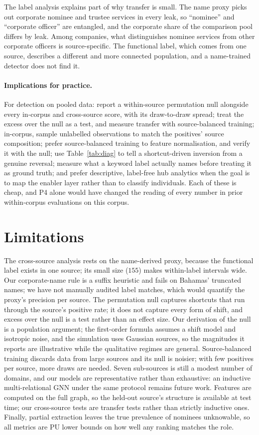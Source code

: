 \documentclass[11pt]{article}
\begin{document}
The label analysis explains part of why transfer is small. The name proxy picks out
corporate nominee and trustee services in every leak, so ``nominee'' and
``corporate officer'' are entangled, and the corporate share of the comparison
pool differs by leak. Among companies, what distinguishes nominee services from
other corporate officers is source-specific. The functional label, which comes
from one source, describes a different and more connected population, and a
name-trained detector does not find it.

\paragraph{Implications for practice.} For detection on pooled data: report a within-source permutation null alongside
every in-corpus and cross-source score, with its draw-to-draw spread; treat the
excess over the null as a test, and measure transfer with source-balanced training;
in-corpus, sample unlabelled observations to match the positives' source
composition; prefer source-balanced training to feature normalisation, and verify
it with the null; use Table~\ref{tab:diag} to tell a shortcut-driven inversion from a
genuine reversal; measure what a keyword label actually
names before treating it as ground truth; and prefer descriptive, label-free hub
analytics when the goal is to map the enabler layer rather than to classify
individuals. Each of these is cheap, and P4 alone would have changed the reading
of every number in prior within-corpus evaluations on this corpus.

\section{Limitations}
The cross-source analysis rests on the name-derived proxy, because the functional
label exists in one source; its small size ($155$) makes within-label intervals
wide. Our corporate-name rule is a suffix heuristic and fails on Bahamas' truncated
names; we have not manually audited label matches, which would quantify the
proxy's precision per source. The permutation null captures shortcuts that run
through the source's positive rate; it does not capture every form of shift, and
excess over the null is a test rather than an effect size. Our derivation of the
null is a population argument; the first-order formula assumes a shift model and
isotropic noise, and the simulation uses Gaussian sources, so the magnitudes it
reports are illustrative while the qualitative regimes are general. Source-balanced
training discards data from large sources and its null is noisier; with few
positives per source, more draws are needed.
Seven sub-sources is still a modest number of domains, and our models are
representative rather than exhaustive: an inductive multi-relational GNN under the
same protocol remains future work. Features are computed on the full graph, so the
held-out source's structure is available at test time; our cross-source tests are
transfer tests rather than strictly inductive ones. Finally, partial extraction
leaves the true prevalence of nominees unknowable, so all metrics are PU lower
bounds on how well any ranking matches the role.
\end{document}
